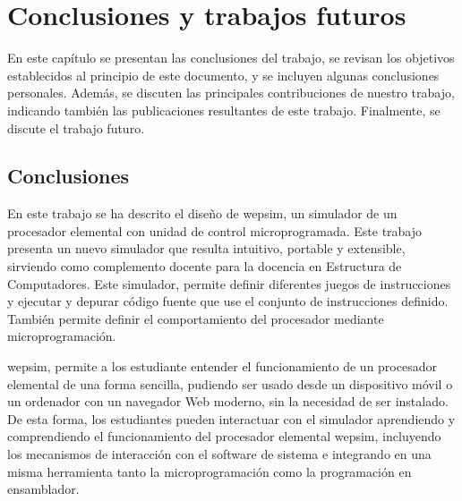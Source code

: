 \chead[]{}
\renewcommand{\headrulewidth}{0.5pt}

\lfoot[]{}
\cfoot[]{}
\rfoot[]{}
\renewcommand{\footrulewidth}{0pt}

\chapter{Conclusiones y trabajos futuros}
\label{ch:conclusions_and_future_work}

En este capítulo se presentan las conclusiones del trabajo, se revisan los objetivos establecidos al principio de este documento, y se incluyen algunas conclusiones personales. Además, se discuten las principales contribuciones de nuestro trabajo, indicando también las publicaciones resultantes de este trabajo. Finalmente, se discute el trabajo futuro.

\section{Conclusiones}

En este trabajo se ha descrito el diseño de \acrshort{wepsim}, un simulador de un procesador elemental con unidad de control microprogramada. Este trabajo presenta un nuevo simulador que resulta intuitivo, portable y extensible, sirviendo como complemento docente para la docencia en Estructura de Computadores. Este simulador, permite definir diferentes juegos de instrucciones y ejecutar y depurar código fuente que use el conjunto de instrucciones definido. También permite definir el comportamiento del procesador mediante microprogramación.

\acrshort{wepsim}, permite a los estudiante entender el funcionamiento de un procesador elemental de una forma sencilla, pudiendo ser usado desde un dispositivo móvil o un ordenador con un navegador Web moderno, sin la necesidad de ser instalado. De esta forma, los estudiantes pueden interactuar con el simulador aprendiendo y comprendiendo el funcionamiento del procesador elemental \acrshort{wepsim}, incluyendo los mecanismos de interacción con el \gls{software} de sistema e integrando en una misma herramienta tanto la microprogramación como la programación en \gls{ensamblador}.

